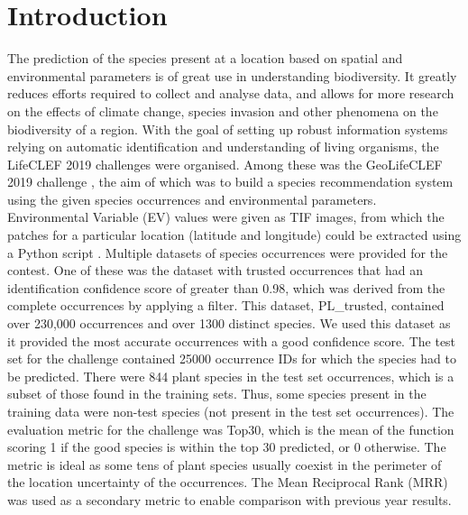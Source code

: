 \documentclass[runningheads]{llncs}
\begin{document}
\section{Introduction}
The prediction of the species present at a location based on spatial and environmental parameters is of great use in understanding biodiversity. It greatly reduces efforts required to collect and analyse data, and allows for more research on the effects of climate change, species invasion and other phenomena on the biodiversity of a region.
\newline 
\newline 
\noindent With the goal of setting up robust information systems relying on automatic identification and understanding of living organisms, the LifeCLEF 2019 challenges \cite{lifeclef2019} were organised. Among these was the GeoLifeCLEF 2019 challenge \cite{geolifeclef2019}, the aim of which was to build a species recommendation system using the given species occurrences and environmental parameters. Environmental Variable (EV) values were given as TIF images, from which the patches for a particular location (latitude and longitude) could be extracted using a Python script \cite{maxgit}. 
\newline
\newline
\noindent Multiple datasets of species occurrences were provided for the contest. One of these was the dataset with trusted occurrences that had an identification confidence score of greater than 0.98, which was derived from the complete occurrences by applying a filter. This dataset, PL\_trusted, contained over 230,000 occurrences and over 1300 distinct species. We used this dataset as it provided the most accurate occurrences with a good confidence score.
\newline
\newline
\noindent The test set for the challenge contained 25000 occurrence IDs for which the species had to be predicted. There were 844 plant species in the test set occurrences, which is a subset of those found in the training sets. Thus, some species present in the training data were non-test species (not present in the test set occurrences).
\newline
\newline
\noindent The evaluation metric for the challenge was Top30, which is the mean of the function scoring 1 if the good species is within the top 30 predicted, or 0 otherwise. The metric is ideal as some tens of plant species usually coexist in the perimeter of the location uncertainty of the occurrences. The Mean Reciprocal Rank (MRR) was used as a secondary metric to enable comparison with previous year results.
\end{document}
